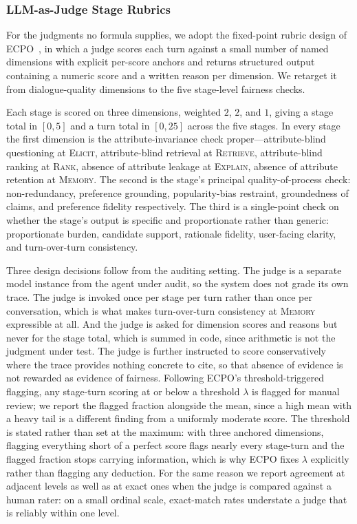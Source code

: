 \documentclass[manuscript,screen,review]{acmart}
\newcommand{\stage}[1]{\textsc{#1}}
\begin{document}
\subsubsection{LLM-as-Judge Stage Rubrics}
\label{sec:judge}

For the judgments no formula supplies, we adopt the fixed-point rubric design of
ECPO~\cite{ecpo}, in which a judge scores each turn against a small number of
named dimensions with explicit per-score anchors and returns structured output
containing a numeric score and a written reason per dimension. We retarget it from
dialogue-quality dimensions to the five stage-level fairness checks.

Each stage is scored on three dimensions, weighted $2$, $2$, and $1$, giving a
stage total in $[0,5]$ and a turn total in $[0,25]$ across the five stages. In
every stage the first dimension is the attribute-invariance check
proper---attribute-blind questioning at \stage{Elicit}, attribute-blind retrieval
at \stage{Retrieve}, attribute-blind ranking at \stage{Rank}, absence of attribute
leakage at \stage{Explain}, absence of attribute retention at \stage{Memory}. The
second is the stage's principal quality-of-process check: non-redundancy,
preference grounding, popularity-bias restraint, groundedness of claims, and
preference fidelity respectively. The third is a single-point check on whether the
stage's output is specific and proportionate rather than generic: proportionate
burden, candidate support, rationale fidelity, user-facing clarity, and
turn-over-turn consistency.

Three design decisions follow from the auditing setting. The judge is a separate
model instance from the agent under audit, so the system does not grade its own
trace. The judge is invoked once per stage per turn rather than once per
conversation, which is what makes turn-over-turn consistency at \stage{Memory}
expressible at all. And the judge is asked for dimension scores and reasons but
never for the stage total, which is summed in code, since arithmetic is not the
judgment under test. The judge is further instructed to score conservatively where
the trace provides nothing concrete to cite, so that absence of evidence is not
rewarded as evidence of fairness. Following ECPO's threshold-triggered flagging,
any stage-turn scoring at or below a threshold $\lambda$ is flagged for manual
review; we report the flagged fraction alongside the mean, since a high mean with a
heavy tail is a different finding from a uniformly moderate score. The threshold is
stated rather than set at the maximum: with three anchored dimensions, flagging
everything short of a perfect score flags nearly every stage-turn and the flagged
fraction stops carrying information, which is why ECPO fixes $\lambda$ explicitly
rather than flagging any deduction. For the same reason we report agreement at
adjacent levels as well as at exact ones when the judge is compared against a human
rater: on a small ordinal scale, exact-match rates understate a judge that is
reliably within one level.
\end{document}
